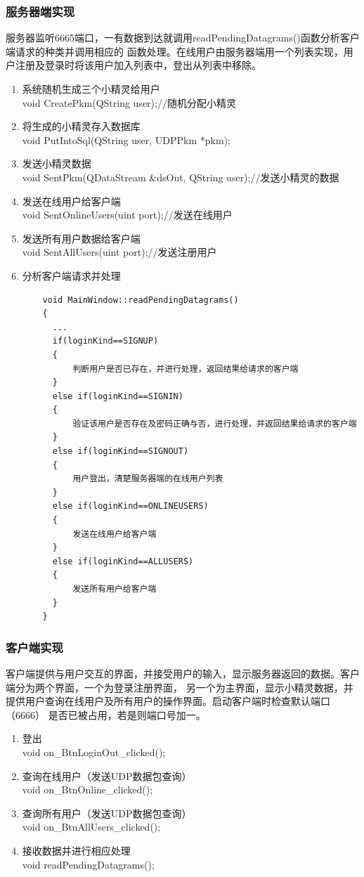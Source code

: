 \documentclass{ctexart}
\begin{document}
\subsubsection{服务器端实现}
服务器监听6665端口，一有数据到达就调用readPendingDatagrams()函数分析客户端请求的种类并调用相应的
函数处理。在线用户由服务器端用一个列表实现，用户注册及登录时将该用户加入列表中，登出从列表中移除。
\begin{enumerate}
  \item 系统随机生成三个小精灵给用户\\
    void CreatePkm(QString user);//随机分配小精灵
  \item 将生成的小精灵存入数据库\\
    void PutIntoSql(QString user, UDPPkm *pkm);
  \item 发送小精灵数据\\
    void SentPkm(QDataStream \&dsOut, QString user);//发送小精灵的数据
  \item 发送在线用户给客户端\\
    void SentOnlineUsers(uint port);//发送在线用户
  \item 发送所有用户数据给客户端\\
    void SentAllUsers(uint port);//发送注册用户
  \item 分析客户端请求并处理
  \lstset{language=C++}
  \begin{lstlisting}
    void MainWindow::readPendingDatagrams()
    {
      ...
      if(loginKind==SIGNUP)
      {
          判断用户是否已存在，并进行处理，返回结果给请求的客户端
      }
      else if(loginKind==SIGNIN)
      {
          验证该用户是否存在及密码正确与否，进行处理，并返回结果给请求的客户端
      }
      else if(loginKind==SIGNOUT)
      {
          用户登出，清楚服务器端的在线用户列表
      }
      else if(loginKind==ONLINEUSERS)
      {
          发送在线用户给客户端
      }
      else if(loginKind==ALLUSERS)
      {
          发送所有用户给客户端
      }
    }
  \end{lstlisting}
\end{enumerate}
\subsubsection{客户端实现}
客户端提供与用户交互的界面，并接受用户的输入，显示服务器返回的数据。客户端分为两个界面，一个为登录注册界面，
另一个为主界面，显示小精灵数据，并提供用户查询在线用户及所有用户的操作界面。启动客户端时检查默认端口（6666）
是否已被占用，若是则端口号加一。
\begin{enumerate}
  \item 登出\\
    void on\_BtnLoginOut\_clicked();
  \item 查询在线用户（发送UDP数据包查询）\\
    void on\_BtnOnline\_clicked();
  \item 查询所有用户（发送UDP数据包查询）\\
    void on\_BtnAllUsers\_clicked();
  \item 接收数据并进行相应处理\\
    void readPendingDatagrams();
\end{enumerate}
\end{document}
